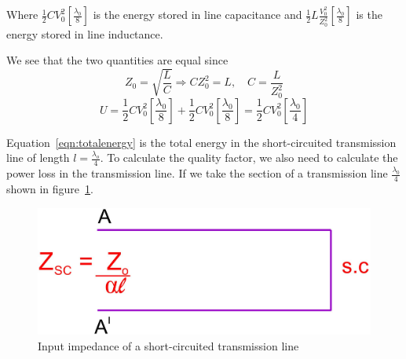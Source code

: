 Where $\frac{1}{2}CV_0^{2}\left[\frac{\lambda_{0}}{8}\right] $ is the energy stored in line capacitance and $ \frac{1}{2}L\frac{V_0^{2}}{Z_0^{2}}\left[ \frac{\lambda_{0}}{8} \right] $ is the energy stored in line inductance.

We see that the two quantities are equal since
\begin{equation*}
Z_0 = \sqrt{\frac{L}{C}}\Longrightarrow CZ_0^{2} = L,\quad C = \frac{L}{Z_0^{2}}
\end{equation*}
\begin{dmath}
U = \frac{1}{2}CV_0^{2}\left[\frac{\lambda_{0}}{8}\right] +\frac{1}{2}CV_0^{2}\left[\frac{\lambda_{0}}{8}\right]
= \frac{1}{2}CV_0^{2}\left[\frac{\lambda_{0}}{4}\right]
\label{eqn:totalenergy}
\end{dmath}

Equation~\eqref{eqn:totalenergy} is the total energy in the short-circuited transmission line of length $l = \frac{\lambda_o}{4}$. To calculate the quality factor, we also need to calculate the power loss in the transmission line. If we take the section of a transmission line $\frac{\lambda_{0}}{4}$ shown in figure~\ref{fig:fig4}.
\begin{figure}[h]
\centering
\includegraphics[width=1\linewidth]{./graphics/fig4}
\caption{Input impedance of a short-circuited transmission line}
\label{fig:fig4}
\end{figure}

